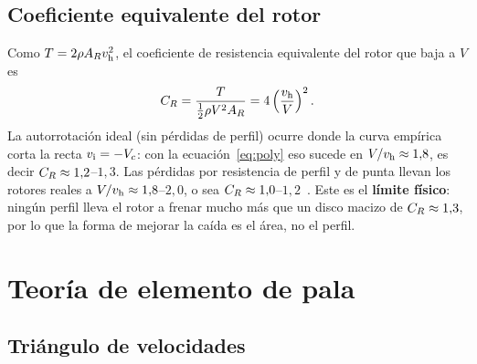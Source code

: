 \subsection{Coeficiente equivalente del rotor}
Como $T=2\rho A_Rv_{\mathrm{h}}^2$, el coeficiente de resistencia equivalente del rotor que baja a $V$ es
\begin{equation}
  C_{R} = \frac{T}{\tfrac12\rho V^2 A_R} = 4\left(\frac{v_{\mathrm{h}}}{V}\right)^2 .
  \label{eq:CR}
\end{equation}
La autorrotación ideal (sin pérdidas de perfil) ocurre donde la curva empírica corta la
recta $v_{\mathrm{i}}=-V_c$: con la ecuación~\eqref{eq:poly} eso sucede en $V/v_{\mathrm{h}}\approx1{,}8$, es
decir $C_{R}\approx1{,}2$--$1{,}3$. Las pérdidas por resistencia de perfil y de punta
llevan los rotores reales a $V/v_{\mathrm{h}}\approx1{,}8$--$2{,}0$, o sea
$C_{R}\approx1{,}0$--$1{,}2$~\cite{leishman2006,johnson1980}. Este es el
\textbf{límite físico}: ningún perfil lleva el rotor a frenar mucho más que un disco
macizo de $C_{R}\approx1{,}3$, por lo que la forma de mejorar la caída es el área, no el
perfil.

\section{Teoría de elemento de pala}\label{sec:bet}

\subsection{Triángulo de velocidades}

